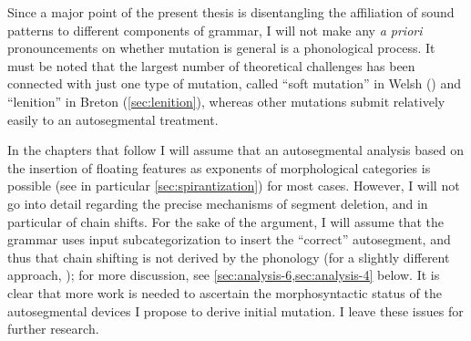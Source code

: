 Since a major point of the present thesis is disentangling the affiliation of sound patterns to different components of grammar, I will not make any \emph{a priori} pronouncements on whether mutation is general is a phonological process. It must be noted that the largest number of theoretical challenges has been connected with just one type of mutation, called \enquote{soft mutation} in Welsh () and \enquote{lenition} in Breton (\cref{sec:lenition}), whereas other mutations submit relatively easily to an autosegmental treatment.

In the chapters that follow I will assume that an autosegmental analysis based on the insertion of floating features as exponents of morphological categories is possible (see in particular \cref{sec:spirantization}) for most cases. However, I will not go into detail regarding the precise mechanisms of segment deletion, and in particular of chain shifts. For the sake of the argument, I will assume that the grammar uses input subcategorization \citep{paster06:_phonol,bye-allomorphy,yu07} to insert the \enquote{correct} autosegment, and thus that chain shifting is not derived by the phonology (for a slightly different approach, \cf \citealp{wolf2007}); for more discussion, see \cref{sec:analysis-6,sec:analysis-4} below. It is clear that more work is needed to ascertain the morphosyntactic status of the autosegmental devices I propose to derive initial mutation. I leave these issues for further research.
